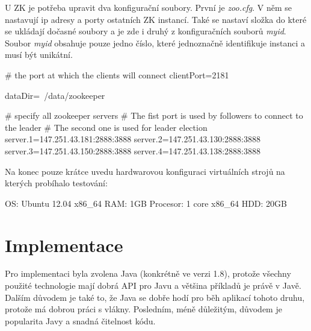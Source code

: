 \documentclass[
  digital, %
  table,   %
  nolof,     %
  nolot,     %
  oneside, %
  nocover,
  monochrome,
  12pt
]{fithesis3}
\begin{document}
U ZK je potřeba upravit dva konfigurační soubory. První je \textit{zoo.cfg}. V něm se nastavují ip adresy a porty ostatních ZK instancí. Také se nastaví složka do které se ukládají dočasné soubory a je zde i druhý z konfiguračních souborů \textit{myid}. Soubor \textit{myid} obsahuje pouze jedno číslo, které jednoznačně identifikuje instanci a musí být unikátní.

\begin{center}
\begin{minipage}[H]{\linewidth}
	\begin{mylisting}
# the port at which the clients will connect
clientPort=2181

dataDir=~/data/zookeeper

# specify all zookeeper servers
# The fist port is used by followers to connect to the leader
# The second one is used for leader election
server.1=147.251.43.181:2888:3888
server.2=147.251.43.130:2888:3888
server.3=147.251.43.150:2888:3888
server.4=147.251.43.138:2888:3888
	\end{mylisting}
	\label{fig:zk-conf} 
\end{minipage}
\end{center}

Na konec pouze krátce uvedu hardwarovou konfiguraci virtuálních strojů na kterých probíhalo testování:

\begin{center}
\begin{minipage}[H]{.5\linewidth}
	\begin{mylisting}
OS: Ubuntu 12.04 x86_64
RAM: 1GB
Procesor: 1 core x86_64
HDD: 20GB
	\end{mylisting}
	\label{fig:virt-hw-conf} 
\end{minipage}
\end{center}

\section{Implementace}
\label{sec:implementation}
Pro implementaci byla zvolena Java (konkrétně ve verzi 1.8), protože všechny použité technologie mají dobrá API pro Javu a většina příkladů je právě v Javě. Dalším důvodem je také to, že Java se dobře hodí pro běh aplikací tohoto druhu, protože má dobrou práci s vlákny. Posledním, méně důležitým, důvodem je popularita Javy a snadná čitelnost kódu.
\end{document}
